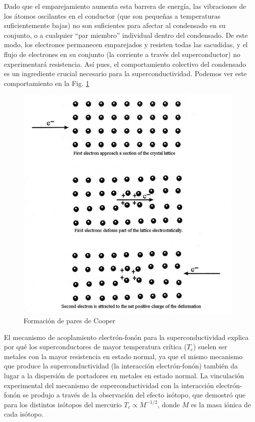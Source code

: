 Dado que el emparejamiento aumenta esta barrera de energía, las vibraciones de los átomos oscilantes en el conductor (que son pequeñas a temperaturas suficientemente bajas) no son suficientes para afectar al condensado en su conjunto, o a cualquier ``par miembro'' individual dentro del condensado. De este modo, los electrones permanecen emparejados y resisten todas las sacudidas, y el flujo de electrones en su conjunto (la corriente a través del superconductor) no experimentará resistencia. Así pues, el comportamiento colectivo del condensado es un ingrediente crucial necesario para la superconductividad. Podemos ver este comportamiento en la Fig. \ref{Fig_superconductors_BCS}

\begin{figure}[h]
    \centering 
    \includegraphics[width=1\linewidth]{Figuras/Fig_superconductors_BCS.jpg}
    \caption{Formación de pares de Cooper}
    \label{Fig_superconductors_BCS}
\end{figure}

El mecanismo de acoplamiento electrón-fonón para la superconductividad explica por qué los superconductores de mayor temperatura crítica ($T_c$) suelen ser metales con la mayor resistencia en estado normal, ya que el mismo mecanismo que produce la superconductividad (la interacción electrón-fonón) también da lugar a la dispersión de portadores en metales en estado normal. La vinculación experimental del mecanismo de superconductividad con la interacción electrón-fonón se produjo a través de la observación del efecto isótopo, que demostró que para los distintos isótopos del mercurio $T_c \propto M^{-1/2}$, donde $M$ es la masa iónica de cada isótopo.

